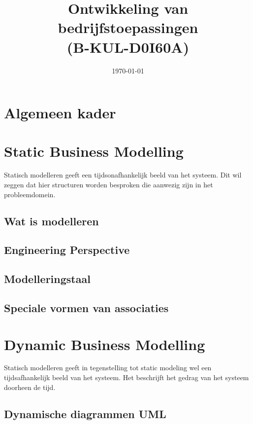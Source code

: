 \documentclass[oneside,11pt]{book}
\title{Ontwikkeling van bedrijfstoepassingen \\ (B-KUL-D0I60A)}
\date{\today}
\author{\theauthors}
\begin{document}
\frontmatter


\tableofcontents


\mainmatter
\chapter{Algemeen kader}


\chapter{Static Business Modelling}
Statisch modelleren geeft een tijdsonafhankelijk beeld van het systeem. Dit wil zeggen dat hier  structuren worden besproken die aanwezig zijn in het probleemdomein.

\section{Wat is modelleren}



\section{Engineering Perspective}


\section{Modelleringstaal}


\section{Speciale vormen van associaties}



\chapter{Dynamic Business Modelling}
Statisch modelleren geeft in tegenstelling tot static modeling wel een tijdsafhankelijk beeld van het systeem. Het beschrijft het gedrag van het systeem doorheen de tijd.

\section{Dynamische diagrammen UML}

\end{document}
